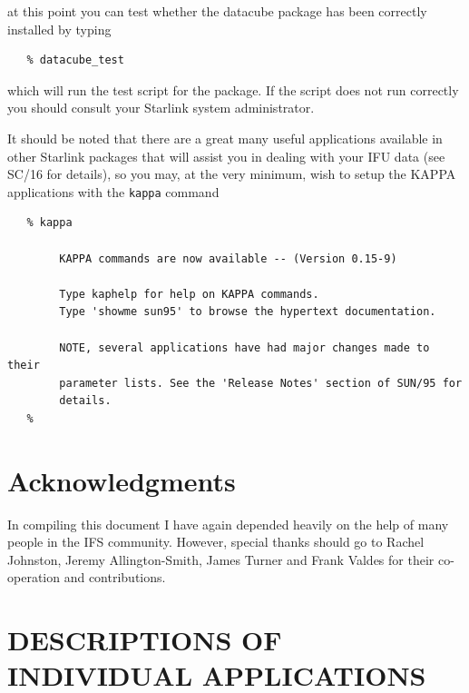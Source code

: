 \documentclass[twoside,11pt]{article}
\newcommand{\htmladdnormallink}[2]{#1}
\newcommand{\xref}[3]{#1}
\newcommand{\xlabel}[1]{}
\begin{document}
at this point you can test whether the datacube package has been correctly installed by typing

\small\begin{verbatim}
   % datacube_test
\end{verbatim}\normalsize

which will run the test script for the package. If the script does not run correctly you should consult your Starlink system administrator.

It should be noted that there are a great many useful applications available in other Starlink packages that will assist you in dealing with your IFU data (see \xref{SC/16}{sc16}{} for details), so you may, at the very minimum, wish to setup the \xref{KAPPA}{sun95}{} applications with the {\tt kappa} command

\small\begin{verbatim}
   % kappa
 
        KAPPA commands are now available -- (Version 0.15-9)

        Type kaphelp for help on KAPPA commands.
        Type 'showme sun95' to browse the hypertext documentation.

        NOTE, several applications have had major changes made to their
        parameter lists. See the 'Release Notes' section of SUN/95 for
        details.
   %	
\end{verbatim}\normalsize

\section*{\xlabel{sun237_acks}Acknowledgments\label{sun237_acks}}

In compiling this document I have again depended heavily on the help of many people in the IFS community. However, special thanks should go to \htmladdnormallink{Rachel Johnston}{http://www.ast.cam.ac.uk/~raj/}, \htmladdnormallink{Jeremy Allington-Smith}{http://star-www.dur.ac.uk:80/~jra/}, \htmladdnormallink{James Turner}{mailto:J.E.H.Turner@durham.ac.uk} and \htmladdnormallink{Frank Valdes}{http://www.noao.edu/noao/scistaff/valdes.html} for their co-operation and contributions.

\newpage
\appendix
\section{DESCRIPTIONS OF INDIVIDUAL APPLICATIONS}
\label{sun237_appendix_descriptions}
\end{document}
